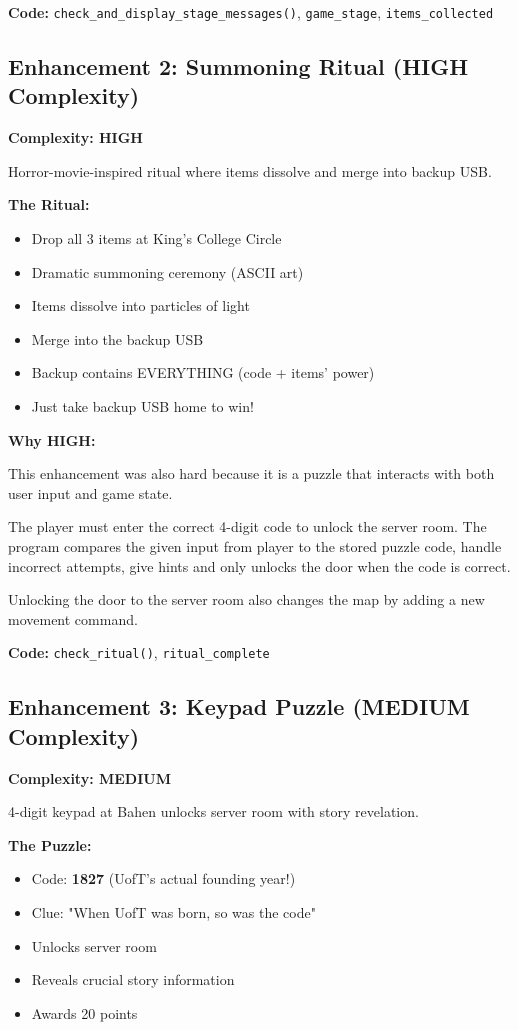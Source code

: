 \documentclass[12pt]{article}
\begin{document}
\textbf{Code:} \texttt{check\_and\_display\_stage\_messages()}, \texttt{game\_stage}, \texttt{items\_collected}

\subsection{Enhancement 2: Summoning Ritual (HIGH Complexity)}

\textbf{Complexity: HIGH}

Horror-movie-inspired ritual where items dissolve and merge into backup USB.

\textbf{The Ritual:}
\begin{itemize}
\item Drop all 3 items at King's College Circle
\item Dramatic summoning ceremony (ASCII art)
\item Items dissolve into particles of light
\item Merge into the backup USB
\item Backup contains EVERYTHING (code + items' power)
\item Just take backup USB home to win!
\end{itemize}

\textbf{Why HIGH:}

This enhancement was also hard because it is a puzzle that interacts 
with both user input and game state.

The player must enter the correct 4-digit code to unlock the server 
room. The program compares the given input from player to the stored puzzle code, handle incorrect attempts, give hints and only unlocks the door when the code is correct.

Unlocking the door to the server room also changes the map by adding a new movement command.

\textbf{Code:} \texttt{check\_ritual()}, \texttt{ritual\_complete}

\subsection{Enhancement 3: Keypad Puzzle (MEDIUM Complexity)}

\textbf{Complexity: MEDIUM}

4-digit keypad at Bahen unlocks server room with story revelation.

\textbf{The Puzzle:}
\begin{itemize}
\item Code: \textbf{1827} (UofT's actual founding year!)
\item Clue: "When UofT was born, so was the code"
\item Unlocks server room
\item Reveals crucial story information
\item Awards 20 points
\end{itemize}
\end{document}
